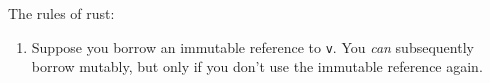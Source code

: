 The rules of rust:

\begin{enumerate}
\item Suppose you borrow an immutable reference to {\tt v}. You \emph{can} subsequently borrow mutably, but only if you don't use the immutable reference again.
\end{enumerate}